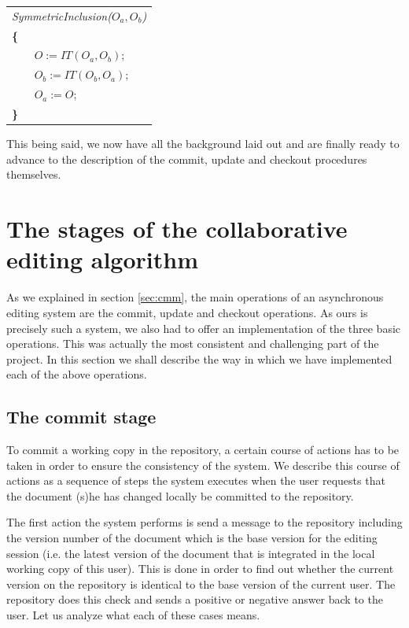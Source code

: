 \begin{center}
\begin{tabular}[c]{|l|}
\hline
\emph{SymmetricInclusion($O_{a},O_{b}$)}\\
\textbf{\{}\\
\verb+    +$O := IT(O_{a},O_{b})$;\\
\verb+    +$O_{b} := IT(O_{b},O_{a})$;\\
\verb+    +$O_{a} := O$;\\
\textbf{\}}\\
\hline
\end{tabular}
\end{center}

This being said, we now have all the background laid out and are finally ready to advance
to the description of the commit, update and checkout procedures themselves.

\section{The stages of the collaborative editing algorithm}

As we explained in section \ref{sec:cmm}, the main operations of an asynchronous editing
system are the commit, update and checkout operations. As ours is precisely such a system,
we also had to offer an implementation of the three basic operations. This was actually
the most consistent and challenging part of the project. In this section we shall describe
the way in which we have implemented each of the above operations.

\subsection{The commit stage}
\label{sec:commit}

To commit a working copy in the repository, a certain course of actions has to be taken in
order to ensure the consistency of the system. We describe this course of actions as a sequence
of steps the system executes when the user requests that the document (s)he has changed locally
be committed to the repository.

The first action the system performs is send a message to the repository including the version
number of the document which is the base version for the editing session (i.e. the latest version
of the document that is integrated in the local working copy of this user). This is done
in order to find out whether the current version on the repository is identical to the base
version of the current user. The repository does this check and sends a positive or negative answer
back to the user. Let us analyze what each of these cases means.

